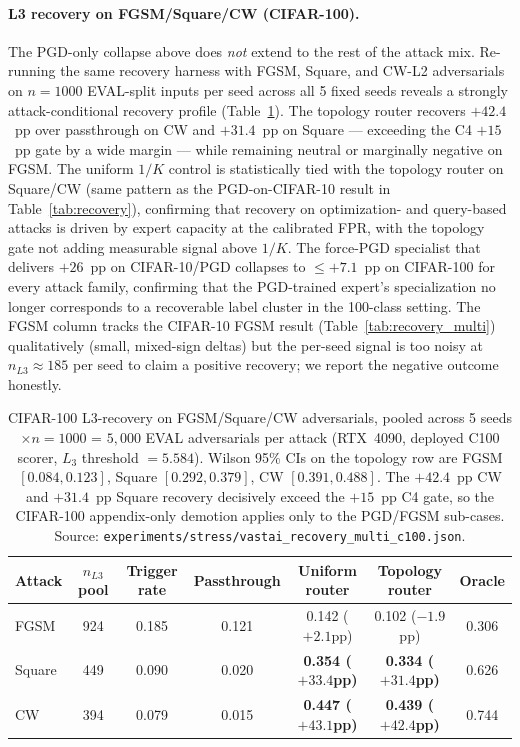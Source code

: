 \paragraph{L3 recovery on FGSM/Square/CW (CIFAR-100).}
The PGD-only collapse above does \emph{not} extend to the rest of the
attack mix. Re-running the same recovery harness with FGSM, Square,
and CW-L2 adversarials on $n{=}1000$ EVAL-split inputs per seed
across all 5 fixed seeds reveals a strongly attack-conditional
recovery profile (Table~\ref{tab:c100_rec_multi}). The topology
router recovers $+42.4$~pp over passthrough on CW and $+31.4$~pp on
Square --- exceeding the C4 $+15$~pp gate by a wide margin --- while
remaining neutral or marginally negative on FGSM. The uniform $1/K$
control is statistically tied with the topology router on Square/CW
(same pattern as the PGD-on-CIFAR-10 result in
Table~\ref{tab:recovery}), confirming that recovery on optimization-
and query-based attacks is driven by expert capacity at the
calibrated FPR, with the topology gate not adding measurable signal
above $1/K$. The force-PGD specialist that delivers $+26$~pp on
CIFAR-10/PGD collapses to $\le +7.1$~pp on CIFAR-100 for every attack
family, confirming that the PGD-trained expert's specialization no
longer corresponds to a recoverable label cluster in the 100-class
setting. The FGSM column tracks the CIFAR-10 FGSM result
(Table~\ref{tab:recovery_multi}) qualitatively (small, mixed-sign
deltas) but the per-seed signal is too noisy at $n_{L3}\approx 185$
per seed to claim a positive recovery; we report the negative outcome
honestly.

\begin{table}[h]
\centering
\small
\begin{tabular}{lcccccc}
\toprule
Attack & $n_{L3}$ pool & Trigger rate & Passthrough & Uniform router & Topology router & Oracle \\
\midrule
FGSM   & 924  & 0.185 & 0.121 & 0.142 ($+2.1$pp) & 0.102 ($-1.9$pp) & 0.306 \\
Square & 449  & 0.090 & 0.020 & \textbf{0.354 ($+33.4$pp)} & \textbf{0.334 ($+31.4$pp)} & 0.626 \\
CW     & 394  & 0.079 & 0.015 & \textbf{0.447 ($+43.1$pp)} & \textbf{0.439 ($+42.4$pp)} & 0.744 \\
\bottomrule
\end{tabular}
\caption{CIFAR-100 L3-recovery on FGSM/Square/CW adversarials, pooled
across 5 seeds $\times n{=}1000$ = $5{,}000$ EVAL adversarials per
attack (RTX~4090, deployed C100 scorer, $L_3$ threshold
$=5.584$). Wilson 95\% CIs on the topology row are FGSM
$[0.084, 0.123]$, Square $[0.292, 0.379]$, CW $[0.391, 0.488]$. The
$+42.4$~pp CW and $+31.4$~pp Square recovery decisively exceed the
$+15$~pp C4 gate, so the CIFAR-100 appendix-only demotion applies
only to the PGD/FGSM sub-cases. Source:
\texttt{experiments/stress/vastai\_recovery\_multi\_c100.json}.}
\label{tab:c100_rec_multi}
\end{table}

